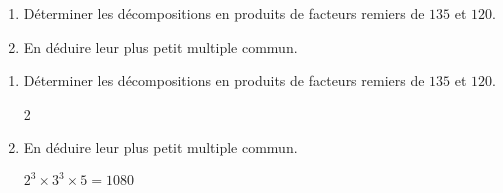 \begin{exercice*}
    \begin{enumerate}
        \item Déterminer les décompositions en produits de facteurs remiers de $135$ et $120$.
        \item En déduire leur plus petit multiple commun.
    \end{enumerate}    
\end{exercice*}
\begin{corrige}
    \begin{enumerate}
        \item Déterminer les décompositions en produits de facteurs remiers de $135$ et $120$.
        
        \begin{multicols}2        
        \columnbreak
        \end{multicols}
        \item En déduire leur plus petit multiple commun.
        
        $2^3\times 3^3\times 5=\num{1080}$
    \end{enumerate}    

\end{corrige}

